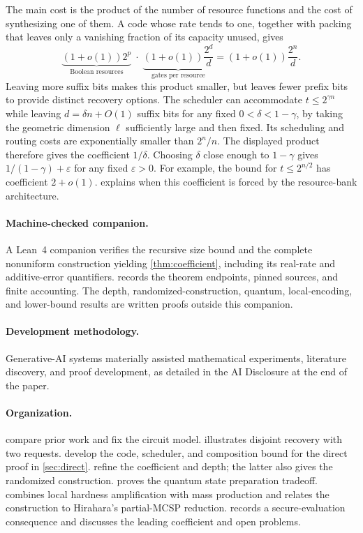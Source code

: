 \documentclass[11pt]{article}
\begin{document}
The main cost is the product of the number of resource functions and the cost
of synthesizing one of them.  A code whose rate tends to one, together with
packing that leaves only a vanishing fraction of its capacity unused, gives
\[
  \underbrace{(1+o(1))2^p}_{\text{Boolean resources}}
  \;\cdot\;
  \underbrace{(1+o(1))\frac{2^d}{d}}_{\text{gates per resource}}
  =(1+o(1))\frac{2^n}{d}.
\]
Leaving more suffix bits makes this product smaller, but leaves fewer prefix
bits to provide distinct recovery options.  The scheduler can accommodate
$t\le2^{\gamma n}$ while leaving $d=\delta n+O(1)$ suffix bits for any fixed
$0<\delta<1-\gamma$, by taking the geometric dimension $\ell$ sufficiently
large and then fixed.  Its scheduling and routing costs are exponentially
smaller than $2^n/n$.  The displayed product therefore gives the coefficient
$1/\delta$.  Choosing $\delta$ close enough to $1-\gamma$ gives
$1/(1-\gamma)+\varepsilon$ for any fixed $\varepsilon>0$.
For example, the bound for $t\le2^{n/2}$ has coefficient $2+o(1)$.
 explains when this coefficient is forced by the
resource-bank architecture.

\paragraph{Machine-checked companion.}
A Lean~4 companion verifies the recursive size bound and the complete
nonuniform construction yielding \cref{thm:coefficient}, including its
real-rate and additive-error quantifiers.  
records the theorem endpoints, pinned sources, and finite accounting.
The depth, randomized-construction, quantum, local-encoding, and lower-bound results
are written proofs outside this companion.

\paragraph{Development methodology.}
Generative-AI systems materially assisted mathematical experiments,
literature discovery, and proof development, as detailed in the AI Disclosure
at the end of the paper.

\paragraph{Organization.}
 compare prior work and fix the circuit
model.   illustrates disjoint recovery with two requests.
 develop the code, scheduler, and
composition bound for the direct proof in \cref{sec:direct}.
 refine the coefficient and depth;
the latter also gives the randomized construction.
 proves the quantum state preparation tradeoff.
 combines local hardness amplification with mass
production and relates the construction to Hirahara's partial-MCSP
reduction.   records a secure-evaluation consequence
and discusses the leading coefficient and open problems.
\end{document}
